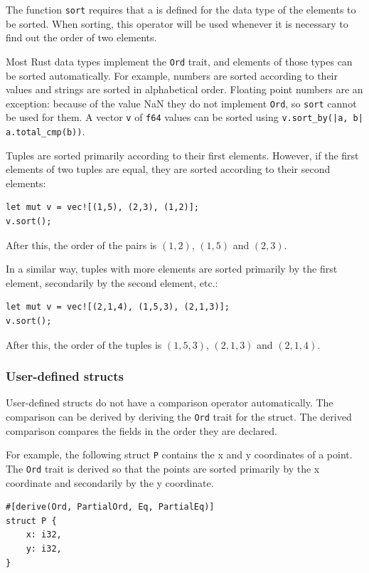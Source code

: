 The function \texttt{sort} requires that
a  is defined for the data type
of the elements to be sorted.
When sorting, this operator will be used
whenever it is necessary to find out the order of two elements.

Most Rust data types implement the \texttt{Ord} trait,
and elements of those types can be sorted automatically.
For example, numbers are sorted according to their values
and strings are sorted in alphabetical order.
Floating point numbers are an exception:
because of the value NaN they do not implement \texttt{Ord},
so \texttt{sort} cannot be used for them.
A vector \texttt{v} of \texttt{f64} values can be sorted
using \texttt{v.sort\_by(|a, b| a.total\_cmp(b))}.

Tuples are sorted primarily according to their
first elements.
However, if the first elements of two tuples are equal,
they are sorted according to their second elements:
\begin{lstlisting}
let mut v = vec![(1,5), (2,3), (1,2)];
v.sort();
\end{lstlisting}
After this, the order of the pairs is
$(1,2)$, $(1,5)$ and $(2,3)$.

In a similar way, tuples with more elements
are sorted primarily by the first element,
secondarily by the second element, etc.:
\begin{lstlisting}
let mut v = vec![(2,1,4), (1,5,3), (2,1,3)];
v.sort();
\end{lstlisting}
After this, the order of the tuples is
$(1,5,3)$, $(2,1,3)$ and $(2,1,4)$.

\subsubsection{User-defined structs}

User-defined structs do not have a comparison
operator automatically.
The comparison can be derived by deriving
the \texttt{Ord} trait for the struct.
The derived comparison compares the fields
in the order they are declared.

For example, the following struct \texttt{P}
contains the x and y coordinates of a point.
The \texttt{Ord} trait is derived so that
the points are sorted primarily by the x coordinate
and secondarily by the y coordinate.

\begin{lstlisting}
#[derive(Ord, PartialOrd, Eq, PartialEq)]
struct P {
    x: i32,
    y: i32,
}
\end{lstlisting}

